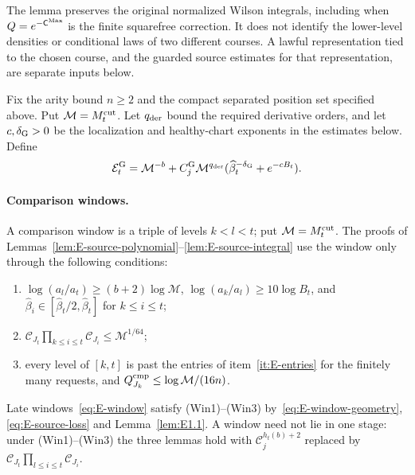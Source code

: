 The lemma preserves the original normalized Wilson integrals, including
when $Q=e^{-\mathsf C^{\rm Max}}$ is the finite squarefree correction.
It does not identify the lower-level densities or conditional laws of
two different courses. A lawful representation tied to the chosen
course, and the guarded source estimates for that representation, are
separate inputs below.

Fix the arity bound $n\ge2$ and the compact separated position set specified above. Put $\mathcal M=M^{\mathrm{cut}}_t$. Let $q_{\rm der}$ bound the required derivative orders, and let $c,\delta_{\rm G}>0$ be the localization and healthy-chart exponents in the estimates below. Define
\begin{equation}\label{eq:E-source-initial}
 \mathcal E_t^{\rm G}=\mathcal M^{-b}
 +C^{\rm G}_j\mathcal M^{q_{\rm der}}
   (\widehat\beta_t^{-\delta_{\rm G}}+e^{-cB_t}).
\end{equation}

\paragraph{Comparison windows.} A comparison window is a triple of levels $k<l<t$; put $\mathcal M=M^{\mathrm{cut}}_t$. The proofs of Lemmas~\ref{lem:E-source-polynomial}--\ref{lem:E-source-integral} use the window only through the following conditions:
\begin{enumerate}
\item[(Win1)] $\log(a_l/a_t)\ge(b+2)\log\mathcal M$, $\log(a_k/a_l)\ge10\log B_t$, and $\widehat\beta_i\in[\widehat\beta_t/2,\widehat\beta_t]$ for $k\le i\le t$;
\item[(Win2)] $\mathcal C_{J_t}\prod_{k\le i\le t}\mathcal C_{J_i}\le\mathcal M^{1/64}$;
\item[(Win3)] every level of $[k,t]$ is past the entries of item~\ref{it:E-entries} for the finitely many requests, and $Q^{\rm cmp}_{J_k}\le\log\mathcal M/(16n)$.
\end{enumerate}
Late windows~\eqref{eq:E-window} satisfy (Win1)--(Win3) by~\eqref{eq:E-window-geometry}, \eqref{eq:E-source-loss} and Lemma~\ref{lem:E1.1}. A window need not lie in one stage: under (Win1)--(Win3) the three lemmas hold with $\mathcal C_j^{h_t(b)+2}$ replaced by $\mathcal C_{J_t}\prod_{l\le i\le t}\mathcal C_{J_i}$.

